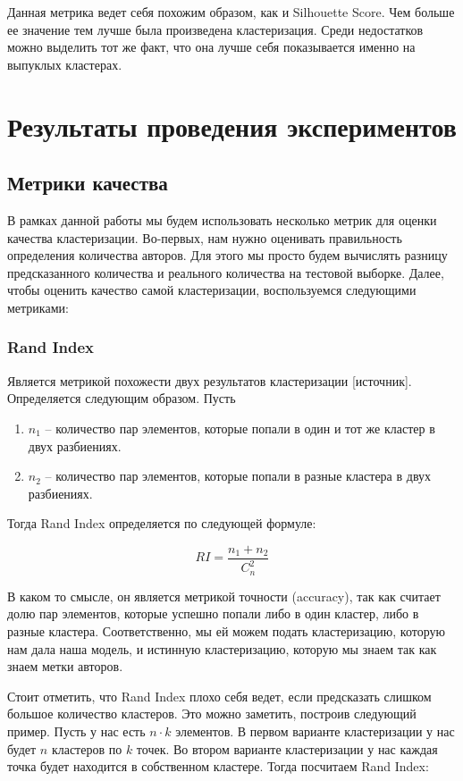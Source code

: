 Данная метрика ведет себя похожим образом, как и Silhouette Score. Чем больше ее значение тем лучше была произведена кластеризация. Среди недостатков можно выделить тот же факт, что она лучше себя показывается именно на выпуклых кластерах.

\newpage
\section{Результаты проведения экспериментов}

\subsection{Метрики качества}

В рамках данной работы мы будем использовать несколько метрик для оценки качества кластеризации. Во-первых, нам нужно оценивать правильность определения количества авторов. Для этого мы просто будем вычислять разницу предсказанного количества и реального количества на тестовой выборке. Далее, чтобы оценить качество самой кластеризации, воспользуемся следующими метриками:

\subsubsection{Rand Index}

Является метрикой похожести двух результатов кластеризации [источник]. Определяется следующим образом. Пусть

\begin{enumerate}
    \item $n_1$ -- количество пар элементов, которые попали в один и тот же кластер в двух разбиениях.
    \item $n_2$ --  количество пар элементов, которые попали в разные кластера в двух разбиениях.
\end{enumerate}

Тогда Rand Index определяется по следующей формуле:

$$
RI = \frac{n_1 + n_2}{C_n^2}
$$

В каком то смысле, он является метрикой точности (accuracy), так как считает долю пар элементов, которые успешно попали либо в один кластер, либо в разные кластера. Соответственно, мы ей можем подать кластеризацию, которую нам дала наша модель, и истинную кластеризацию, которую мы знаем так как знаем метки авторов.

Стоит отметить, что Rand Index плохо себя ведет, если предсказать слишком большое количество кластеров. Это можно заметить, построив следующий пример. Пусть у нас есть $n \cdot k$ элементов. В первом варианте кластеризации у нас будет $n$ кластеров по $k$ точек. Во втором варианте кластеризации у нас каждая точка будет находится в собственном кластере. Тогда посчитаем Rand Index:

